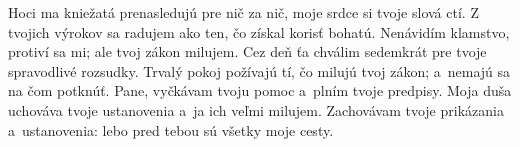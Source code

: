 Hoci ma kniežatá prenasledujú pre nič za nič,
moje srdce si tvoje slová ctí.
\versseparator
Z tvojich výrokov sa radujem
ako ten, čo získal korisť bohatú.
\versseparator
Nenávidím klamstvo, protiví sa mi;
ale tvoj zákon milujem.
\versseparator
Cez deň ťa chválim sedemkrát
pre tvoje spravodlivé rozsudky.
\versseparator
Trvalý pokoj požívajú tí, čo milujú tvoj zákon;
a~nemajú sa na čom potknúť.
\versseparator
Pane, vyčkávam tvoju pomoc
a~plním tvoje predpisy.
\versseparator
Moja duša uchováva tvoje ustanovenia
a~ja ich veľmi milujem.
\versseparator
Zachovávam tvoje prikázania a~ustanovenia:
lebo pred tebou sú všetky moje cesty.